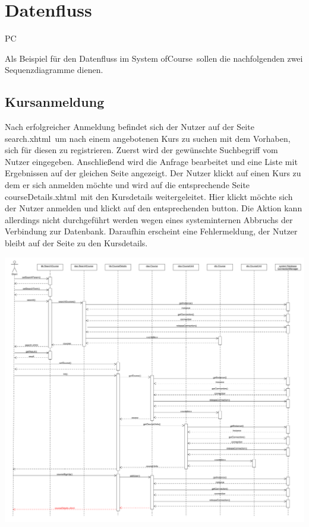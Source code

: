 \chapter{Datenfluss}

\begin{tiny}
PC
\end{tiny}

Als Beispiel für den Datenfluss im System \grqq ofCourse\grqq\ sollen die nachfolgenden zwei Sequenzdiagramme dienen.

\section{Kursanmeldung}

Nach erfolgreicher Anmeldung befindet sich der Nutzer auf der Seite \grqq search.xhtml\grqq\ um nach einem angebotenen Kurs zu suchen mit dem Vorhaben, sich für diesen zu registrieren. Zuerst wird der gewünschte Suchbegriff vom Nutzer eingegeben. Anschließend wird die Anfrage bearbeitet und eine Liste mit Ergebnissen auf der gleichen Seite angezeigt. Der Nutzer klickt auf einen Kurs zu dem er sich anmelden möchte und wird auf die entsprechende Seite \grqq courseDetails.xhtml\grqq\ mit den Kursdetails weitergeleitet. Hier klickt möchte sich der Nutzer anmelden und klickt auf den entsprechenden button. Die Aktion kann allerdings nicht durchgeführt werden wegen eines systeminternen Abbruchs der Verbindung zur Datenbank. Daraufhin erscheint eine Fehlermeldung, der Nutzer bleibt auf der Seite zu den Kursdetails.

\includegraphics[scale=0.26]{./Grafiken/Sequenzdiagramm-Kursanmeldung.pdf}